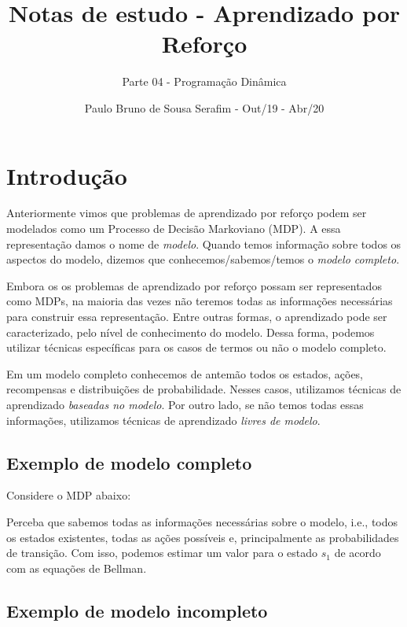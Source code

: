 \documentclass{article}
\title{Notas de estudo - Aprendizado por Reforço}
\author{Parte 04 - Programação Dinâmica}
\date{Paulo Bruno de Sousa Serafim - Out/19 - Abr/20}
\begin{document}
\maketitle

    \section{Introdução}

        Anteriormente vimos que problemas de aprendizado por reforço podem ser modelados como um Processo de Decisão Markoviano (MDP). A essa representação damos o nome de \emph{modelo}. Quando temos informação sobre todos os aspectos do modelo, dizemos que conhecemos/sabemos/temos o \emph{modelo completo}.

        Embora os os problemas de aprendizado por reforço possam ser representados como MDPs, na maioria das vezes não teremos todas as informações necessárias para construir essa representação. Entre outras formas, o aprendizado pode ser caracterizado, pelo nível de conhecimento do modelo. Dessa forma, podemos utilizar técnicas específicas para os casos de termos ou não o modelo completo.

        Em um modelo completo conhecemos de antemão todos os estados, ações, recompensas e distribuições de probabilidade. Nesses casos, utilizamos técnicas de aprendizado \emph{baseadas no modelo}. Por outro lado, se não temos todas essas informações, utilizamos técnicas de aprendizado \emph{livres de modelo}.

        \subsection{Exemplo de modelo completo}
    
            Considere o MDP abaixo:
            
            \begin{center}
            \mdpthreestate
            \end{center}
            
            Perceba que sabemos todas as informações necessárias sobre o modelo, i.e., todos os estados existentes, todas as ações possíveis e, principalmente as probabilidades de transição. Com isso, podemos estimar um valor para o estado $s_1$ de acordo com as equações de Bellman.
            
        \subsection{Exemplo de modelo incompleto}
    
\end{document}

